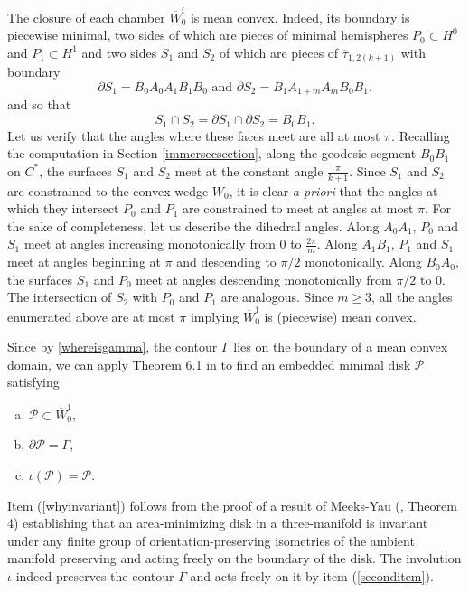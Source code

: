 \documentclass[11pt, reqno]{amsart}
\numberwithin{equation}{section}
\begin{document}
The closure of each chamber $\overline{W}_0^i$ is mean convex.  Indeed, its boundary is  piecewise minimal, two sides of which are pieces of minimal hemispheres  $P_0\subset H^0$ and $P_1\subset H^1$ and two sides $S_1$ and $S_2$ of which are pieces of $\overline{\tau}_{1,2(k+1)}$ with boundary
\begin{equation}
\partial S_1 =B_0A_0A_1B_1B_0\mbox{ and } \partial S_2 = B_1A_{1+m}A_mB_0B_1.
\end{equation}
and so that 
\begin{equation}
S_1\cap S_2=\partial S_1\cap \partial S_2=B_0B_1.
\end{equation}
Let us verify that the angles where these faces meet are all at most $\pi$.  Recalling the computation in Section \ref{immersecsection}, along the geodesic segment $B_0B_1$ on $C^*$, the surfaces $S_1$ and $S_2$ meet at the constant angle $\frac{\pi}{k+1}$.  Since $S_1$ and $S_2$ are constrained to the convex wedge $W_0$, it is clear \emph{a priori} that the angles at which they intersect $P_0$ and $P_1$ are constrained to meet at angles at most $\pi$.  For the sake of completeness, let us describe the dihedral angles.  Along $A_0A_1$, $P_0$ and $S_1$ meet at angles increasing monotonically from $0$ to $\frac{2\pi}{m}$. Along $A_1B_1$, $P_1$ and $S_1$ meet at angles beginning at $\pi$ and descending to $\pi/2$ monotonically.   Along $B_0A_0$, the surfaces $S_1$ and $P_0$ meet at angles descending monotonically from $\pi/2$ to $0$.  The intersection of $S_2$ with $P_0$ and $P_1$ are analogous.  Since $m\geq 3$, all the angles enumerated above are at most $\pi$ implying $\overline{W}_0^1$ is (piecewise) mean convex. 

Since by \eqref{whereisgamma}, the contour $\Gamma$ lies on the boundary of a mean convex domain, we can apply Theorem 6.1 in \cite{J} to find an embedded minimal disk $\mathcal{P}$ satisfying
\begin{enumerate}[(a)]
\item $\mathcal{P}\subset\overline{W}_0^1$, 
\item $\partial\mathcal{P}=\Gamma$, 
\item $\iota(\mathcal{P})=\mathcal{P}$.\label{whyinvariant}
\end{enumerate}
Item (\ref{whyinvariant}) follows from the proof of a result of Meeks-Yau (\cite{MYD}, Theorem 4) establishing that an area-minimizing disk in a three-manifold is invariant under any finite group of orientation-preserving isometries of the ambient manifold preserving and acting freely on the boundary of the disk.  The involution $\iota$ indeed preserves the contour $\Gamma$ and acts freely on it by item (\ref{seconditem}).
\end{document}
